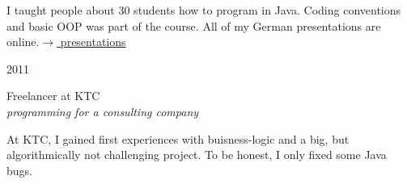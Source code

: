 \documentclass[a4paper,10pt]{article} %
\begin{document}
{\begin{minipage}[t]{0.5\textwidth}
\normalsize{I taught people about 30 students how to program in Java.
Coding conventions and basic OOP was part of the course. All of my German presentations are online.}\hfill \href{http://martin-thoma.com/programmieren-tutorium/#Folien}{$\rightarrow$ presentations}\\


{\raggedleft\textsc{2011}\par}

{\raggedright\large Freelancer at KTC\\
\textit{programming for a consulting company}\\[5pt]}

\normalsize{At KTC, I gained first experiences with buisness-logic
and a big, but algorithmically not challenging project. To be honest,
I only fixed some Java bugs.}\\







\end{minipage} %
\hfill
\begin{minipage}[t]{0.44\textwidth}
\vspace{0pt} %



\end{minipage}}
\end{document}
